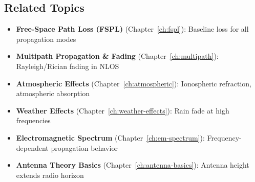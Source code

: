 \subsection*{Related Topics}

\begin{itemize}
\item \textbf{Free-Space Path Loss (FSPL)} (Chapter~\ref{ch:fspl}): Baseline loss for all propagation modes
\item \textbf{Multipath Propagation \& Fading} (Chapter~\ref{ch:multipath}): Rayleigh/Rician fading in NLOS
\item \textbf{Atmospheric Effects} (Chapter~\ref{ch:atmospheric}): Ionospheric refraction, atmospheric absorption
\item \textbf{Weather Effects} (Chapter~\ref{ch:weather-effects}): Rain fade at high frequencies
\item \textbf{Electromagnetic Spectrum} (Chapter~\ref{ch:em-spectrum}): Frequency-dependent propagation behavior
\item \textbf{Antenna Theory Basics} (Chapter~\ref{ch:antenna-basics}): Antenna height extends radio horizon
\end{itemize}
